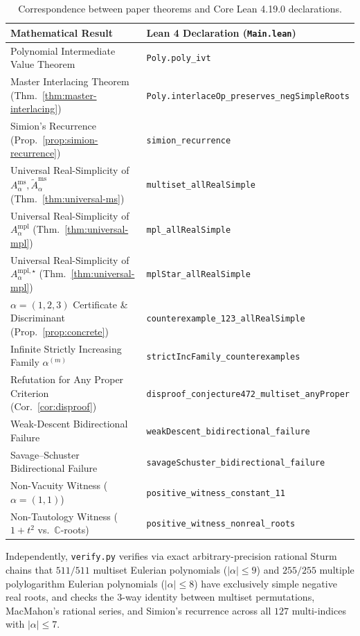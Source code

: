 \documentclass[11pt]{article}
\theoremstyle{definition}
\newcommand{\CC}{\mathbb{C}}
\begin{document}
\begin{table}[htbp]
\centering
\footnotesize
\renewcommand{\arraystretch}{1.15}
\begin{tabular}{ll}
\hline
\textbf{Mathematical Result} & \textbf{Lean 4 Declaration (\texttt{Main.lean})} \\
\hline
Polynomial Intermediate Value Theorem & \texttt{Poly.poly\_ivt} \\
Master Interlacing Theorem (Thm.~\ref{thm:master-interlacing}) & \texttt{Poly.interlaceOp\_preserves\_negSimpleRoots} \\
Simion's Recurrence (Prop.~\ref{prop:simion-recurrence}) & \texttt{simion\_recurrence} \\
Universal Real-Simplicity of $A_\alpha^{\mathrm{ms}}, \tilde{A}_\alpha^{\mathrm{ms}}$ (Thm.~\ref{thm:universal-ms}) & \texttt{multiset\_allRealSimple} \\
Universal Real-Simplicity of $A_\alpha^{\mathrm{mpl}}$ (Thm.~\ref{thm:universal-mpl}) & \texttt{mpl\_allRealSimple} \\
Universal Real-Simplicity of $A_\alpha^{\mathrm{mpl},\star}$ (Thm.~\ref{thm:universal-mpl}) & \texttt{mplStar\_allRealSimple} \\
$\alpha=(1,2,3)$ Certificate \& Discriminant (Prop.~\ref{prop:concrete}) & \texttt{counterexample\_123\_allRealSimple} \\
Infinite Strictly Increasing Family $\alpha^{(m)}$ & \texttt{strictIncFamily\_counterexamples} \\
Refutation for Any Proper Criterion (Cor.~\ref{cor:disproof}) & \texttt{disproof\_conjecture472\_multiset\_anyProper} \\
Weak-Descent Bidirectional Failure & \texttt{weakDescent\_bidirectional\_failure} \\
Savage--Schuster Bidirectional Failure & \texttt{savageSchuster\_bidirectional\_failure} \\
Non-Vacuity Witness ($\alpha=(1,1)$) & \texttt{positive\_witness\_constant\_11} \\
Non-Tautology Witness ($1+t^2$ vs.\ $\CC$-roots) & \texttt{positive\_witness\_nonreal\_roots} \\
\hline
\end{tabular}
\caption{Correspondence between paper theorems and Core Lean 4.19.0 declarations.}
\label{tab:lean-map}
\end{table}

Independently, \texttt{verify.py} verifies via exact arbitrary-precision rational Sturm
chains that $511/511$ multiset Eulerian polynomials ($|\alpha|\le 9$) and $255/255$ multiple
polylogarithm Eulerian polynomials ($|\alpha|\le 8$) have exclusively simple negative real
roots, and checks the $3$-way identity between multiset permutations, MacMahon's rational
series, and Simion's recurrence across all $127$ multi-indices with $|\alpha|\le 7$.
\end{document}
